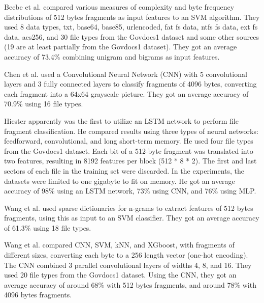 Beebe et al. \cite{beebe_sceadan:_2013}
compared various measures of complexity and byte frequency distributions of 512 bytes fragments as input features to an SVM algorithm.
They used 8 data types, txt, base64, base85, urlencoded, fat fs data, ntfs fs data, ext fs data, aes256, and
30 file types
from the Govdocs1 dataset and some other sources (19 are at least partially from the Govdocs1 dataset).
They got an average accuracy of 73.4\% combining unigram and bigrams as input features.

Chen et al. \cite{chen_file_2018}
used a Convolutional Neural Network (CNN) with 5 convolutional layers and 3 fully connected layers to classify fragments of 4096 bytes, converting each fragment into a 64x64 grayscale picture.
They got an average accuracy of 70.9\% using 16 file types.

Hiester \cite{hiester_file_2018} apparently was the first to utilize an LSTM network to perform file fragment classification. He compared results using three types of neural networks: feedforward, convolutional, and long short-term memory. He used four file types from the Govdocs1 dataset.
Each bit of a 512-byte fragment was translated into two features, resulting in 8192 features per block (512 * 8 * 2). The first and last sectors of each file in the training set were discarded. In the experiments, the datasets were limited to one gigabyte to fit on memory. He got an average accuracy of 98\% using an LSTM network, 73\% using CNN, and 76\% using MLP.

Wang et al. \cite{wang_sparse_2018} 
used sparse dictionaries for n-grams to extract features of 512 bytes fragments, using this as input to an SVM classifier.
They got an average accuracy of 61.3\% using 18 file types.

Wang et al. \cite{wang_file_2018}  
compared CNN, SVM, kNN, and XGboost, with fragments of different sizes, converting each byte to a 256 length vector (one-hot encoding). The CNN combined 3 parallel convolutional layers of widths 4, 8, and 16.
They used 20 file types from the Govdocs1 dataset.
Using the CNN, they got an average accuracy of around 68\% with 512 bytes fragments, and around 78\% with 4096 bytes fragments.

